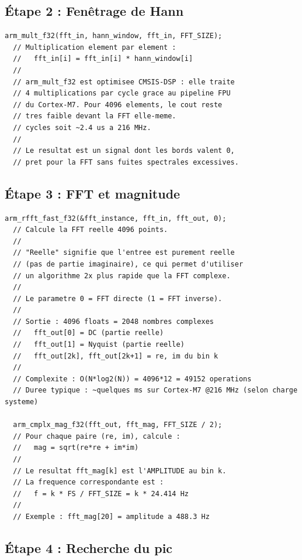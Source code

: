 \documentclass[a4paper,11pt]{article}
\begin{document}
\subsection{\'Etape 2 : Fen\^etrage de Hann}

\begin{lstlisting}[style=cstyle,caption={Application de la fen\^etre de Hann}]
  arm_mult_f32(fft_in, hann_window, fft_in, FFT_SIZE);
  // Multiplication element par element :
  //   fft_in[i] = fft_in[i] * hann_window[i]
  //
  // arm_mult_f32 est optimisee CMSIS-DSP : elle traite
  // 4 multiplications par cycle grace au pipeline FPU
  // du Cortex-M7. Pour 4096 elements, le cout reste
  // tres faible devant la FFT elle-meme.
  // cycles soit ~2.4 us a 216 MHz.
  //
  // Le resultat est un signal dont les bords valent 0,
  // pret pour la FFT sans fuites spectrales excessives.
\end{lstlisting}

\subsection{\'Etape 3 : FFT et magnitude}

\begin{lstlisting}[style=cstyle,caption={FFT rapide r\'eelle et calcul du spectre d'amplitude}]
  arm_rfft_fast_f32(&fft_instance, fft_in, fft_out, 0);
  // Calcule la FFT reelle 4096 points.
  //
  // "Reelle" signifie que l'entree est purement reelle
  // (pas de partie imaginaire), ce qui permet d'utiliser
  // un algorithme 2x plus rapide que la FFT complexe.
  //
  // Le parametre 0 = FFT directe (1 = FFT inverse).
  //
  // Sortie : 4096 floats = 2048 nombres complexes
  //   fft_out[0] = DC (partie reelle)
  //   fft_out[1] = Nyquist (partie reelle)
  //   fft_out[2k], fft_out[2k+1] = re, im du bin k
  //
  // Complexite : O(N*log2(N)) = 4096*12 = 49152 operations
  // Duree typique : ~quelques ms sur Cortex-M7 @216 MHz (selon charge systeme)

  arm_cmplx_mag_f32(fft_out, fft_mag, FFT_SIZE / 2);
  // Pour chaque paire (re, im), calcule :
  //   mag = sqrt(re*re + im*im)
  //
  // Le resultat fft_mag[k] est l'AMPLITUDE au bin k.
  // La frequence correspondante est :
  //   f = k * FS / FFT_SIZE = k * 24.414 Hz
  //
  // Exemple : fft_mag[20] = amplitude a 488.3 Hz
\end{lstlisting}

\subsection{\'Etape 4 : Recherche du pic}
\end{document}
